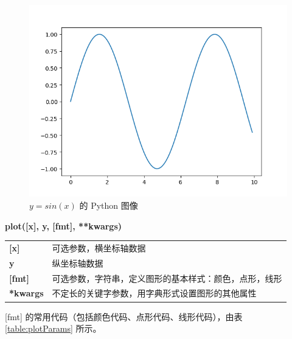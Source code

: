 \begin{figure}[ht]
  \centering
  \includegraphics[scale=0.7]{figure/sinx.png}
  \caption{$y=sin(x)$ 的 Python 图像}\label{fig:sinx}
\end{figure}

\begin{center}
\begin{tcolorbox}[title = plot 函数的语法]
\textbf{plot([x], y, [fmt], **kwargs)}
\tcblower
\vspace{10pt}

\begin{tcboutputlisting}
\begin{tabular}{>{\bfseries}ll}
  [x] &可选参数，横坐标轴数据\\
  y & 纵坐标轴数据\\

[fmt] &可选参数，字符串，定义图形的基本样式：颜色，点形，线形\\
**kwargs &不定长的关键字参数，用字典形式设置图形的其他属性
\end{tabular}
\end{tcboutputlisting}
\tcbuselistingtext

\end{tcolorbox}
\end{center}

[fmt] 的常用代码（包括颜色代码、点形代码、线形代码），由表 \ref{table:plotParams} 所示。

